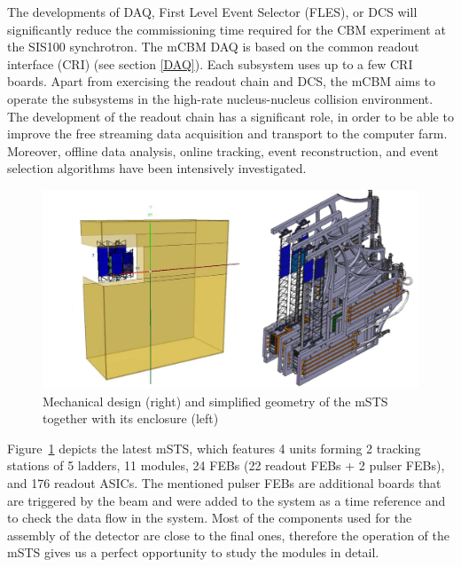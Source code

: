 The developments of DAQ, First Level Event Selector (\gls{FLES}), or \gls{DCS} will significantly reduce the commissioning time required for the CBM experiment at the SIS100 synchrotron. The mCBM \gls{DAQ} is based on the common readout interface (\gls{CRI}) (see section \ref{DAQ}). Each subsystem uses up to a few CRI boards. Apart from exercising the readout chain and DCS, the mCBM aims to operate the subsystems in the high-rate nucleus-nucleus collision environment. The development of the readout chain has a significant role, in order to be able to improve the free streaming data acquisition and transport to the computer farm. Moreover, offline data analysis, online tracking, event reconstruction, and event selection algorithms have been intensively investigated. 

\begin{figure}[!h]
\centering
\includegraphics[width=0.75\columnwidth]{Chapter3/DCS/images/mSTS_mech.png}
\caption{Mechanical design (right) and simplified geometry of the \gls{mSTS} together with its enclosure (left)}
\label{fig_STS}
\end{figure}

Figure~\ref{fig_STS} depicts the latest \gls{mSTS}, which features 4 units forming 2 tracking stations of 5 ladders, 11 modules, 24 \gls{FEB}s (22 readout \gls{FEB}s + 2 pulser \gls{FEB}s), and 176 readout \gls{ASIC}s. The mentioned pulser \gls{FEB}s are additional boards that are triggered by the beam and were added to the system as a time reference and to check the data flow in the system.  Most of the components used for the assembly of the detector are close to the final ones, therefore the operation of the \gls{mSTS} gives us a perfect opportunity to study the modules in detail.
